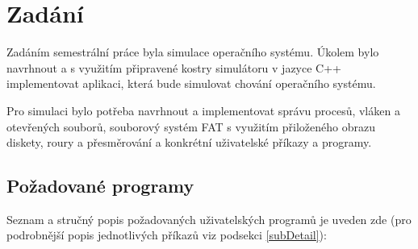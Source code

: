 \documentclass[12pt, a4paper]{article}
\let\oldsection\section
\renewcommand\section{\clearpage\oldsection}
\begin{document}
    \tableofcontents
    \pagebreak

    
	\section{Zadání}
	Zadáním semestrální práce byla simulace operačního systému. Úkolem bylo navrhnout a s využitím připravené kostry simulátoru v jazyce C++ implementovat aplikaci, která bude simulovat chování operačního systému.
	
	Pro simulaci bylo potřeba navrhnout a implementovat správu procesů, vláken a otevřených souborů, souborový systém FAT s využitím přiloženého obrazu diskety, roury a přesměrování a konkrétní uživatelské příkazy a programy. %
	
		\subsection{Požadované programy}
		Seznam a stručný popis požadovaných uživatelských programů je uveden zde (pro podrobnější popis jednotlivých příkazů viz podsekci \ref{subDetail}):
\end{document}
